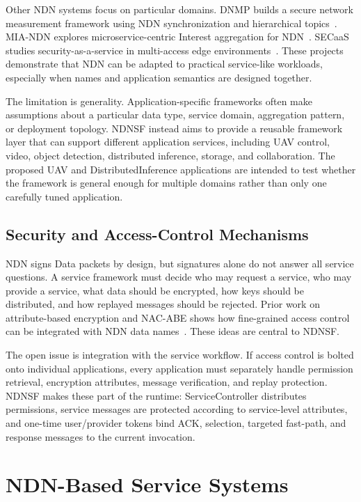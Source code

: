 Other NDN systems focus on particular domains. DNMP builds a secure network
measurement framework using NDN synchronization and hierarchical
topics~\cite{dnmp}. MIA-NDN explores microservice-centric Interest aggregation
for NDN~\cite{miandn}. SECaaS studies security-as-a-service in multi-access
edge environments~\cite{secaas}. These projects demonstrate that NDN can be
adapted to practical service-like workloads, especially when names and
application semantics are designed together.

The limitation is generality. Application-specific frameworks often make
assumptions about a particular data type, service domain, aggregation pattern,
or deployment topology. NDNSF instead aims to provide a reusable framework
layer that can support different application services, including UAV control,
video, object detection, distributed inference, storage, and collaboration.
The proposed UAV and DistributedInference applications are intended to test
whether the framework is general enough for multiple domains rather than only
one carefully tuned application.

\subsection{Security and Access-Control Mechanisms}

NDN signs Data packets by design, but signatures alone do not answer all
service questions. A service framework must decide who may request a service,
who may provide a service, what data should be encrypted, how keys should be
distributed, and how replayed messages should be rejected. Prior work on
attribute-based encryption and NAC-ABE shows how fine-grained access control
can be integrated with NDN data names~\cite{goyal2006abe,dulal2023nacabe}. These ideas
are central to NDNSF.

The open issue is integration with the service workflow. If access control is
bolted onto individual applications, every application must separately handle
permission retrieval, encryption attributes, message verification, and replay
protection. NDNSF makes these part of the runtime: ServiceController
distributes permissions, service messages are protected according to
service-level attributes, and one-time user/provider tokens bind ACK,
selection, targeted fast-path, and response messages to the current invocation.

\section{NDN-Based Service Systems}

